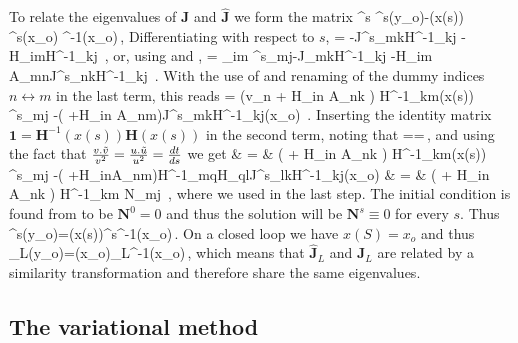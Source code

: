   To relate the eigenvalues of $\mathbf{J}$ and $\mathbf{\hat{J}}$ we form the matrix
  \beq
  	^s \equiv {}^s(y_o)-(x(s)) ^s(x_o) ^{-1}(x_o)\,,
	\label{eq:def:N}
  \eeq
  Differentiating with respect to $s$, 
  \beq
  	  =  -J^s_{mk}H^{-1}_{kj}
						-H_{im}H^{-1}_{kj} \,,
  \eeq
  or, using  and ,
  \beq
	  = \hdtds{}_{im} ^s_{mj}-J_{mk}H^{-1}_{kj}
						-H_{im} \dtds A_{mn}J^s_{nk}H^{-1}_{kj} \,.
  \eeq
  With the use of  and renaming of the dummy indices $n\leftrightarrow m$ in the last term, this reads
  \beq	
	 = \hdtds \left(v_n + H_{in} A_{nk} \right)
				H^{-1}_{km}(x(s)) ^s_{mj} 
				-\left(
						+\dtds H_{in} A_{nm}\right)J^s_{mk}H^{-1}_{kj}(x_o) \,.
  \eeq
  Inserting the identity matrix $\mathbf{1} = \mathbf{H}^{-1}(x(s))\mathbf{H}(x(s))$ in the second term, noting that
  \beq
  	==\,,
  \eeq
  and using the fact that $\frac{v.\tilde{v}}{v^2}=\frac{u.\tilde{u}}{u^2}={\frac{d t}{d s}}$ we get
  \bea
	 & = &  \left(  +  H_{in} A_{nk} \right)
				H^{-1}_{km}(x(s)) ^s_{mj} 
				-\left(
						+H_{in}A_{nm}\right)H^{-1}_{mq}H_{ql}J^s_{lk}H^{-1}_{kj}(x_o) \continue
			& = & \left(  +  H_{in} A_{nk} \right) H^{-1}_{km} N_{mj} \,,
	\label{eq:dNds}
  \eea
  where we used  in the last step.  The initial condition is found from  
  to be $\mathbf{N}^0=0$ and thus the solution will be $\mathbf{N}^s \equiv 0$ for every $s$. Thus
 \beq
 	^s(y_o)=(x(s))^s^{-1}(x_o)\,.
 \eeq  
 On a closed loop we have $x(S)=x_o$ and thus
 \beq
 	_L(y_o)=(x_o)_L^{-1}(x_o)\,,
 \eeq
 which means that $\mathbf{\hat{J}}_L$ and $\mathbf{J}_L$ are related by a similarity transformation and therefore
 share the same eigenvalues. 
  
  

   
    
\subsection{The variational method}

